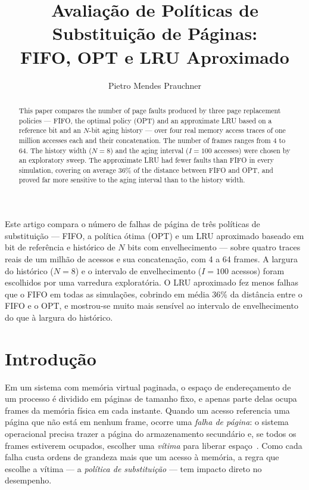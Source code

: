 \documentclass[12pt]{article}
\title{Avaliação de Políticas de Substituição de Páginas:\\
  FIFO, OPT e LRU Aproximado}
\author{Pietro Mendes Prauchner\inst{1}}
\begin{document}
\maketitle

\begin{abstract}
  This paper compares the number of page faults produced by three page
  replacement policies --- FIFO, the optimal policy (OPT) and an approximate LRU
  based on a reference bit and an $N$-bit aging history --- over four real
  memory access traces of one million accesses each and their concatenation.
  The number of frames ranges from 4 to 64. The history width ($N=8$) and the
  aging interval ($I=100$ accesses) were chosen by an exploratory sweep. The
  approximate LRU had fewer faults than FIFO in every simulation, covering on
  average 36\% of the distance between FIFO and OPT, and proved far more
  sensitive to the aging interval than to the history width.
\end{abstract}

\begin{resumo}
  Este artigo compara o número de falhas de página de três políticas de
  substituição --- FIFO, a política ótima (OPT) e um LRU aproximado baseado em
  bit de referência e histórico de $N$ bits com envelhecimento --- sobre quatro
  traces reais de um milhão de acessos e sua concatenação, com 4 a 64 frames.
  A largura do histórico ($N=8$) e o intervalo de envelhecimento ($I=100$
  acessos) foram escolhidos por uma varredura exploratória. O LRU aproximado
  fez menos falhas que o FIFO em todas as simulações, cobrindo em média 36\% da
  distância entre o FIFO e o OPT, e mostrou-se muito mais sensível ao intervalo
  de envelhecimento do que à largura do histórico.
\end{resumo}

\section{Introdução}

Em um sistema com memória virtual paginada, o espaço de endereçamento de um
processo é dividido em páginas de tamanho fixo, e apenas parte delas ocupa
frames da memória física em cada instante. Quando um acesso referencia uma
página que não está em nenhum frame, ocorre uma \emph{falha de página}: o
sistema operacional precisa trazer a página do armazenamento secundário e, se
todos os frames estiverem ocupados, escolher uma \emph{vítima} para liberar
espaço~\cite{silberschatz:18}. Como cada falha custa ordens de grandeza mais
que um acesso à memória, a regra que escolhe a vítima --- a \emph{política de
substituição} --- tem impacto direto no desempenho.
\end{document}

